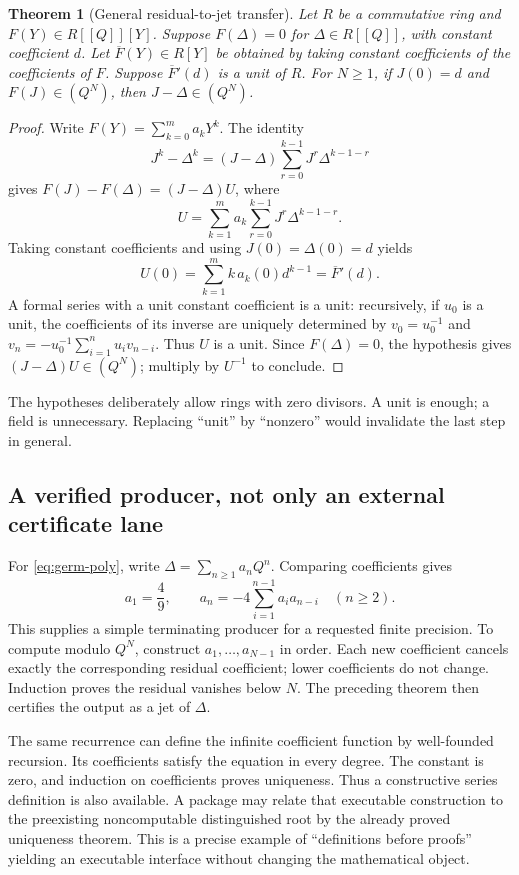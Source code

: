 \documentclass[11pt,letterpaper]{article}
\newtheorem{theorem}{Theorem}[section]
\theoremstyle{definition}
\theoremstyle{remark}
\begin{document}
\begin{theorem}[General residual-to-jet transfer]
Let $R$ be a commutative ring and $F(Y)\in R[[Q]][Y]$. Suppose
$F(\Delta)=0$ for $\Delta\in R[[Q]]$, with constant coefficient $d$.
Let $\overline F(Y)\in R[Y]$ be obtained by taking constant coefficients of
the coefficients of $F$. Suppose $\overline F'(d)$ is a unit of $R$.
For $N\geq1$, if $J(0)=d$ and $F(J)\in(Q^N)$, then $J-\Delta\in(Q^N)$.
\end{theorem}
\begin{proof}
Write $F(Y)=\sum_{k=0}^{m}a_kY^k$. The identity
\[
 J^k-\Delta^k=(J-\Delta)
       \sum_{r=0}^{k-1}J^r\Delta^{k-1-r}
\]
gives $F(J)-F(\Delta)=(J-\Delta)U$, where
\[
 U=\sum_{k=1}^{m}a_k\sum_{r=0}^{k-1}J^r\Delta^{k-1-r}.
\]
Taking constant coefficients and using $J(0)=\Delta(0)=d$ yields
\[
 U(0)=\sum_{k=1}^{m} k\,a_k(0)d^{k-1}=\overline F'(d).
\]
A formal series with a unit constant coefficient is a unit: recursively, if
$u_0$ is a unit, the coefficients of its inverse are uniquely determined by
$v_0=u_0^{-1}$ and
$v_n=-u_0^{-1}\sum_{i=1}^{n}u_i v_{n-i}$. Thus $U$ is a unit. Since $F(\Delta)=0$,
the hypothesis gives $(J-\Delta)U\in(Q^N)$; multiply by $U^{-1}$ to conclude.
\end{proof}
The hypotheses deliberately allow rings with zero divisors. A unit is enough;
a field is unnecessary. Replacing ``unit'' by ``nonzero'' would invalidate the
last step in general.

\subsection{A verified producer, not only an external certificate lane}
For \eqref{eq:germ-poly}, write $\Delta=\sum_{n\geq1}a_nQ^n$.
Comparing coefficients gives
\begin{equation}
 a_1=\frac49,\qquad
 a_n=-4\sum_{i=1}^{n-1}a_i a_{n-i}\quad(n\geq2).
 \label{eq:jet-recurrence}
\end{equation}
This supplies a simple terminating producer for a requested finite precision.
To compute modulo $Q^N$, construct $a_1,\ldots,a_{N-1}$ in order. Each new
coefficient cancels exactly the corresponding residual coefficient; lower
coefficients do not change. Induction proves the residual vanishes below $N$.
The preceding theorem then certifies the output as a jet of $\Delta$.

The same recurrence can define the infinite coefficient function by
well-founded recursion. Its coefficients satisfy the equation in every degree.
The constant is zero, and induction on coefficients proves uniqueness.
Thus a constructive series definition is also available. A package may relate
that executable construction to the preexisting noncomputable distinguished
root by the already proved uniqueness theorem. This is a precise example of
``definitions before proofs'' yielding an executable interface without changing
the mathematical object.
\end{document}
